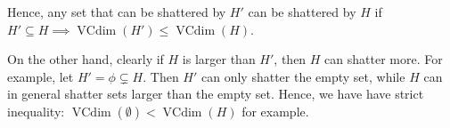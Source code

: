 \documentclass[11pt]{article}
\DeclareMathOperator{\vcdim}{VCdim}
\begin{document}
Hence, any set that can be shattered by $H'$ can be shattered by $H$ if
$H' \subseteq H \implies \vcdim(H') \leq \vcdim(H)$.

On the other hand, clearly if $H$ is larger than $H'$, then $H$ can shatter more.
For example, let $H' = \phi \subsetneq H$. Then $H'$ can only shatter the empty
set, while $H$ can in general shatter sets larger than the empty set. Hence,
we have have strict inequality: $\vcdim(\emptyset) < \vcdim(H)$ for example.
\end{document}

